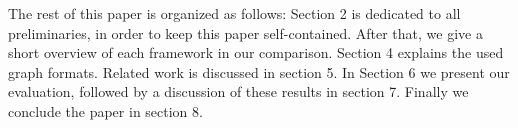 The rest of this paper is organized as follows:
Section 2 is dedicated to all preliminaries, in order to keep this paper self-contained.
After that, we give a short overview of each framework in our comparison.
Section 4 explains the used graph formats. 
Related work is discussed in section 5.
In Section 6 we present our evaluation, followed by a discussion of these results in section 7. Finally we conclude the paper in section 8.
